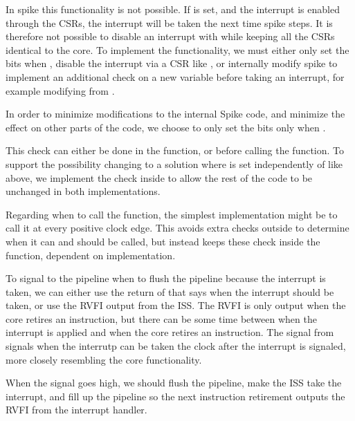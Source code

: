 In spike this functionality is not possible. If  is set, and the interrupt is enabled through the CSRs, the interrupt will be taken the next time spike steps. It is therefore not possible to disable an interrupt with  while keeping all the CSRs identical to the core. To implement the  functionality, we must either only set the  bits when , disable the interrupt via a CSR like , or internally modify spike to implement an additional check on a new  variable before taking an interrupt, for example modifying  from  \cite{SpikeRISCVISA2023}. 

In order to minimize modifications to the internal Spike code, and minimize the effect on other parts of the code, we choose to only set the  bits only when . 

This check can either be done in the  function, or before calling the function. To support the possibility changing to a solution where  is set independently of  like above, we implement the  check inside  to allow the rest of the code to be unchanged in both implementations.


Regarding when to call the  function, the simplest implementation might be to call it at every positive clock edge. This avoids extra checks outside  to determine when it can and should be called, but instead keeps these check inside the function, dependent on implementation. 



To signal to the pipeline when to flush the pipeline because the interrupt is taken, we can either use the return of  that says when the interrupt should be taken, or use the RVFI output from the ISS. The RVFI is only output when the core retires an instruction, but there can be some time between when the interrupt is applied and when the core retires an instruction. The  signal from  signals when the interrutp can be taken the clock after the interrupt is signaled, more closely resembling the core functionality. 

When the  signal goes high, we should flush the pipeline, make the ISS take the interrupt, and fill up the pipeline so the next instruction retirement outputs the RVFI from the interrupt handler.




